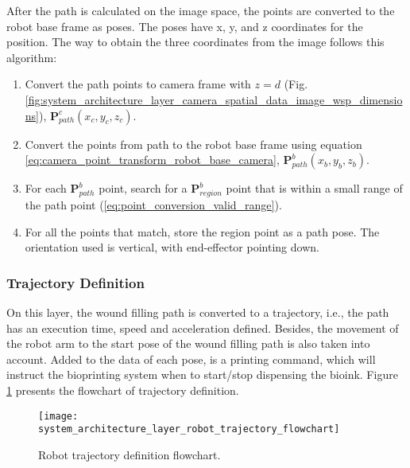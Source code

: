 After the path is calculated on the image space, the points are converted to the robot base frame as poses. The poses have x, y, and z coordinates for the position. The way to obtain the three coordinates from the image follows this algorithm:

\begin{enumerate}
    \item Convert the path points to camera frame with $z = d$ (Fig. \ref{fig:system_architecture_layer_camera_spatial_data_image_wsp_dimensions}), $\boldsymbol{P}^c_{path}(x_c, y_c, z_c)$.
    \item Convert the points from path to the robot base frame using equation \ref{eq:camera_point_transform_robot_base_camera}, $\boldsymbol{P}^b_{path}(x_b, y_b, z_b)$.
    \item For each $\boldsymbol{P}^b_{path}$ point, search for a $\boldsymbol{P}^b_{region}$ point that is within a small range of the path point (\ref{eq:point_conversion_valid_range}).
    \item For all the points that match, store the region point as a path pose. The orientation used is vertical, with end-effector pointing down.
\end{enumerate} 


\subsubsection*{Trajectory Definition}
\label{subsubsec:system_architectural_robot_layers_trajectory_definition}

On this layer, the wound filling path is converted to a trajectory, i.e., the path has an execution time, speed and acceleration defined. Besides, the movement of the robot arm to the start pose of the wound filling path is also taken into account. Added to the data of each pose, is a printing command, which will instruct the bioprinting system when to start/stop dispensing the bioink. Figure \ref{fig:system_architecture_layer_robot_trajectory_flowchart} presents the flowchart of trajectory definition.

\begin{figure}[htbp]
	\centering
	\texttt{[image: system\_architecture\_layer\_robot\_trajectory\_flowchart]}
	\caption[Robot trajectory definition flowchart.]{Robot trajectory definition flowchart.}
	\label{fig:system_architecture_layer_robot_trajectory_flowchart}
\end{figure}


